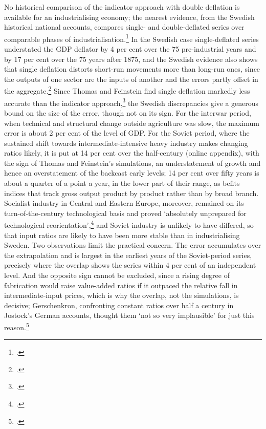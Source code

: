 No historical comparison of the indicator approach with double deflation is available for an industrialising economy; the nearest evidence, from the Swedish historical national accounts, compares single- and double-deflated series over comparable phases of industrialisation.\footnote{\autocite[19]{swedengdp_15602010}.} In the Swedish case single-deflated series understated the GDP deflator by 4 per cent over the 75 pre-industrial years and by 17 per cent over the 75 years after 1875, and the Swedish evidence also shows that single deflation distorts short-run movements more than long-run ones, since the outputs of one sector are the inputs of another and the errors partly offset in the aggregate.\footnote{\autocite[148--53]{lobellschonkrantz2008}.} Since Thomas and Feinstein find single deflation markedly less accurate than the indicator approach,\footnote{\autocite[443--4]{thomasfeinstein2003}.} the Swedish discrepancies give a generous bound on the size of the error, though not on its sign. For the interwar period, when technical and structural change outside agriculture was slow, the maximum error is about 2 per cent of the level of GDP. For the Soviet period, where the sustained shift towards intermediate-intensive heavy industry makes changing ratios likely, it is put at 14 per cent over the half-century (online appendix), with the sign of Thomas and Feinstein's simulations, an understatement of growth and hence an overstatement of the backcast early levels; 14 per cent over fifty years is about a quarter of a point a year, in the lower part of their range, as befits indices that track gross output product by product rather than by broad branch. Socialist industry in Central and Eastern Europe, moreover, remained on its turn-of-the-century technological basis and proved `absolutely unprepared for technological reorientation',\footnote{\autocite[195--7]{berend_centraleastern19441993}.} and Soviet industry is unlikely to have differed, so that input ratios are likely to have been more stable than in industrialising Sweden. Two observations limit the practical concern. The error accumulates over the extrapolation and is largest in the earliest years of the Soviet-period series, precisely where the overlap shows the series within 4 per cent of an independent level. And the opposite sign cannot be excluded, since a rising degree of fabrication would raise value-added ratios if it outpaced the relative fall in intermediate-input prices, which is why the overlap, not the simulations, is decisive; Gerschenkron, confronting constant ratios over half a century in Jostock's German accounts, thought them `not so very implausible' for just this reason.\footnote{\autocite[453]{gerschenkron1957}.}

